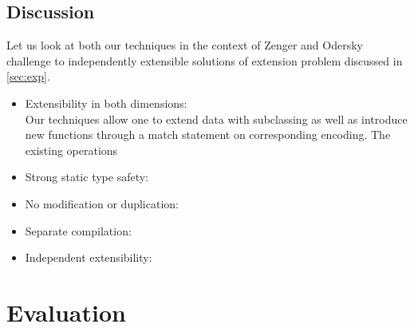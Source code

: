 \documentclass[preprint]{sigplanconf}
\begin{document}
\subsection{Discussion}
\label{sec:dsc}

Let us look at both our techniques in the context of Zenger and Odersky 
challenge to independently extensible solutions of extension problem discussed 
in \textsection\ref{sec:exp}.

\begin{itemize}
\item Extensibility in both dimensions: \\
      Our techniques allow one to extend data with subclassing as well as 
      introduce new functions through a match statement on corresponding 
      encoding. The existing operations 
\item Strong static type safety: \\
\item No modification or duplication: \\
\item Separate compilation: \\
\item Independent extensibility: \\
\end{itemize}

\section{Evaluation} %
\label{sec:eval}
\end{document}
